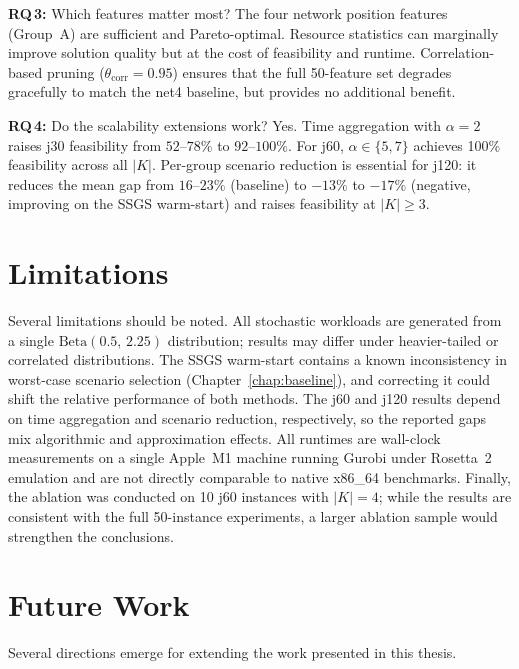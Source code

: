 \textbf{RQ\,3:} Which features matter most?
The four network position features (Group~A) are sufficient
and Pareto-optimal. Resource statistics can marginally improve
solution quality but at the cost of feasibility and runtime.
Correlation-based pruning ($\theta_{\mathrm{corr}} = 0.95$)
ensures that the full 50-feature set degrades gracefully to
match the net4 baseline, but provides no additional benefit.

\textbf{RQ\,4:} Do the scalability extensions work?
Yes. Time aggregation with $\alpha = 2$ raises j30 feasibility
from $52$--$78\%$ to $92$--$100\%$. For j60, $\alpha \in \{5,7\}$
achieves 100\% feasibility across all $|K|$. Per-group scenario
reduction is essential for j120: it reduces the mean gap from
$16$--$23\%$ (baseline) to $-13\%$ to $-17\%$ (negative,
improving on the SSGS warm-start) and raises feasibility at
$|K| \geq 3$.

\section{Limitations}
\label{sec:conclusion_limitations}
Several limitations should be noted. All stochastic workloads
are generated from a single $\mathrm{Beta}(0.5,\,2.25)$
distribution; results may differ under heavier-tailed or
correlated distributions. The SSGS warm-start contains a known
inconsistency in worst-case scenario selection
(Chapter~\ref{chap:baseline}), and correcting it could shift
the relative performance of both methods. The j60 and j120
results depend on time aggregation and scenario reduction,
respectively, so the reported gaps mix algorithmic and
approximation effects. All runtimes are wall-clock measurements
on a single Apple~M1 machine running Gurobi under Rosetta~2
emulation and are not directly comparable to native x86\_64
benchmarks. Finally, the ablation was conducted on 10 j60
instances with $|K|=4$; while the results are consistent with
the full 50-instance experiments, a larger ablation sample
would strengthen the conclusions.

\section{Future Work}
\label{sec:future_work}
Several directions emerge for extending the work presented in
this thesis.

